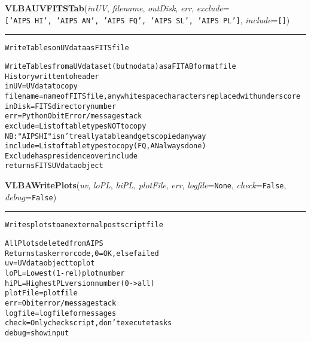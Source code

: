     \begin{boxedminipage}{\textwidth}

    \raggedright \textbf{VLBAUVFITSTab}(\textit{inUV}, \textit{filename}, \textit{outDisk}, \textit{err}, \textit{exclude}=\texttt{[\-'\-A\-I\-P\-S\-~\-H\-I\-'\-,\-~\-'\-A\-I\-P\-S\-~\-A\-N\-'\-,\-~\-'\-A\-I\-P\-S\-~\-F\-Q\-'\-,\-~\-'\-A\-I\-P\-S\-~\-S\-L\-'\-,\-~\-'\-A\-I\-P\-S\-~\-P\-L\-'\-]\-}, \textit{include}=\texttt{[\-]\-})

    \vspace{-1.5ex}

    \rule{\textwidth}{0.5\fboxrule}
\begin{alltt}
Write Tables on UV data as FITS file

Write Tables from a UV data set (but no data) as a FITAB format file
History written to header
inUV       = UV data to copy
filename   = name of FITS file, any whitespace characters replaced with underscore 
inDisk     = FITS directory number
err        = Python Obit Error/message stack
exclude    = List of table types NOT to copy
             NB: "AIPS HI" isn't really a table and gets copied anyway
include    = List of table types to copy (FQ, AN always done )
             Exclude has presidence over include
returns FITS UV data object\end{alltt}

    \vspace{1ex}

    \end{boxedminipage}

    \label{VLBACal:VLBAWritePlots}
    \vspace{0.5ex}

    \begin{boxedminipage}{\textwidth}

    \raggedright \textbf{VLBAWritePlots}(\textit{uv}, \textit{loPL}, \textit{hiPL}, \textit{plotFile}, \textit{err}, \textit{logfile}=\texttt{N\-o\-n\-e\-}, \textit{check}=\texttt{F\-a\-l\-s\-e\-}, \textit{debug}=\texttt{F\-a\-l\-s\-e\-})

    \vspace{-1.5ex}

    \rule{\textwidth}{0.5\fboxrule}
\begin{alltt}
Writes plots to an external postscript file

All Plots deleted from AIPS
Returns task error code, 0=OK, else failed
uv       = UV data object to plot
loPL     = Lowest (1-rel) plot number
hiPL     = Highest PL version number (0-{\textgreater}all)
plotFile = plot file
err      = Obit error/message stack
logfile  = logfile for messages
check    = Only check script, don't execute tasks
debug    = show input\end{alltt}

    \vspace{1ex}

    \end{boxedminipage}

